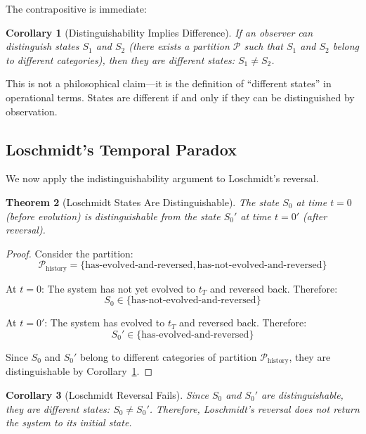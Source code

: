 \documentclass[twocolumn,10pt]{article}
\newtheorem{theorem}{Theorem}[section]
\newtheorem{corollary}[theorem]{Corollary}
\theoremstyle{definition}
\theoremstyle{remark}
\begin{document}
\noindent The contrapositive is immediate:

\begin{corollary}[Distinguishability Implies Difference]
\label{cor:distinguishability}
If an observer can distinguish states $S_1$ and $S_2$ (there exists a partition $\mathcal{P}$ such that $S_1$ and $S_2$ belong to different categories), then they are different states: $S_1 \neq S_2$.
\end{corollary}

\noindent This is not a philosophical claim—it is the definition of ``different states'' in operational terms. States are different if and only if they can be distinguished by observation.

\subsection{Loschmidt's Temporal Paradox}

We now apply the indistinguishability argument to Loschmidt's reversal.

\begin{theorem}[Loschmidt States Are Distinguishable]
\label{thm:loschmidt_distinguishable}
The state $S_0$ at time $t=0$ (before evolution) is distinguishable from the state $S_0'$ at time $t=0'$ (after reversal).
\end{theorem}

\begin{proof}
Consider the partition:
\begin{equation}
\mathcal{P}_{\text{history}} = \{\text{has-evolved-and-reversed}, \text{has-not-evolved-and-reversed}\}
\end{equation}

At $t=0$: The system has not yet evolved to $t_T$ and reversed back. Therefore:
\begin{equation}
S_0 \in \{\text{has-not-evolved-and-reversed}\}
\end{equation}

At $t=0'$: The system has evolved to $t_T$ and reversed back. Therefore:
\begin{equation}
S_0' \in \{\text{has-evolved-and-reversed}\}
\end{equation}

Since $S_0$ and $S_0'$ belong to different categories of partition $\mathcal{P}_{\text{history}}$, they are distinguishable by Corollary~\ref{cor:distinguishability}.
\end{proof}

\begin{corollary}[Loschmidt Reversal Fails]
\label{cor:loschmidt_fails}
Since $S_0$ and $S_0'$ are distinguishable, they are different states: $S_0 \neq S_0'$. Therefore, Loschmidt's reversal does not return the system to its initial state.
\end{corollary}
\end{document}
